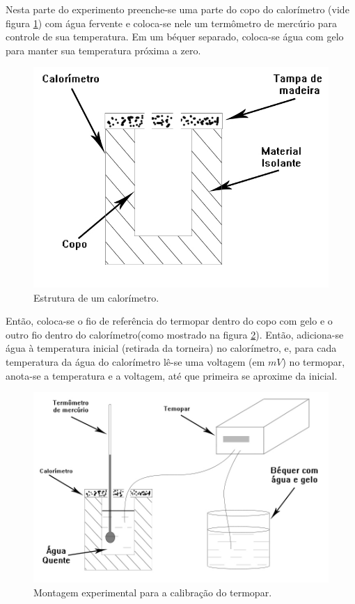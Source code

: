 \documentclass[12pt,a4paper]{article}
\begin{document}
  Nesta parte do experimento preenche-se uma parte do copo do calorímetro (vide figura \ref{calorimetro}) com água fervente e coloca-se nele um termômetro de mercúrio para controle de sua temperatura. Em um béquer separado, coloca-se água com gelo para manter sua temperatura próxima a zero.\\

\begin{figure}[!htbp]
\centering
\includegraphics[scale=0.3]{Fig6a1.jpg}
\caption{Estrutura de um calorímetro.}
\label{calorimetro}
\end{figure}

Então, coloca-se o fio de referência do termopar dentro do copo com gelo e o outro fio dentro do calorímetro(como mostrado na figura \ref{exptermopar}). Então, adiciona-se água à temperatura inicial (retirada da torneira) no calorímetro, e, para cada temperatura da água do calorímetro lê-se uma voltagem (em $mV$) no termopar, anota-se a temperatura e a voltagem, até que primeira se aproxime da inicial.

\begin{figure}[!htbp]
\centering
\includegraphics[scale=0.3]{Fig6a2.jpg}
\caption{Montagem experimental para a calibração do termopar.}
\label{exptermopar}
\end{figure}
\end{document}
